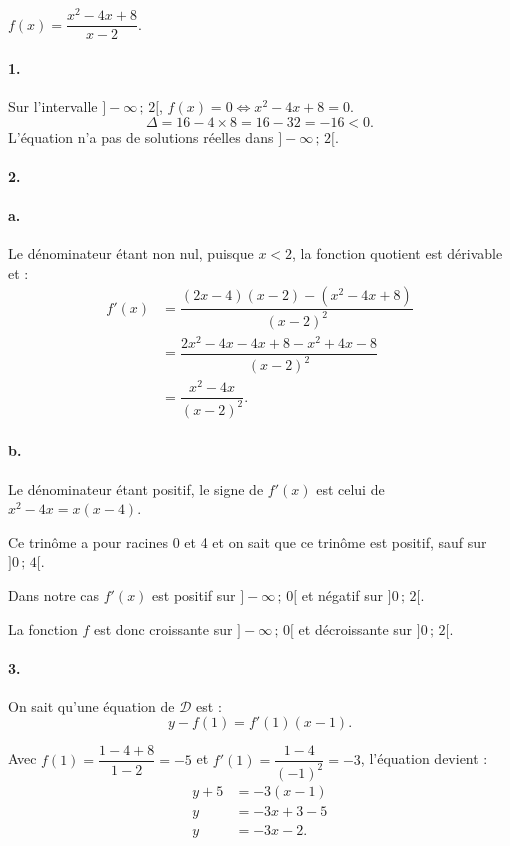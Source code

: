 \( f(x) = \dfrac{x^2 - 4x + 8}{x - 2} \).

\paragraph{1.} Sur l'intervalle \( ]-\infty \,;\, 2[ \), \( f(x) = 0 \iff x^2 - 4x + 8 = 0 \).
\[
\Delta = 16 - 4 \times 8 = 16 - 32 = -16 < 0.
\]
L'équation n'a pas de solutions réelles dans \( ]-\infty \,;\, 2[ \).

\paragraph{2.}

\paragraph{a.} Le dénominateur étant non nul, puisque \( x < 2 \), la fonction quotient est dérivable et :
\begin{align*}
f'(x) &= \dfrac{(2x - 4)(x - 2) - (x^2 - 4x + 8)}{(x - 2)^2} \\
&= \dfrac{2x^2 - 4x - 4x + 8 - x^2 + 4x - 8}{(x - 2)^2} \\
&= \dfrac{x^2 - 4x}{(x - 2)^2}.
\end{align*}

\paragraph{b.} Le dénominateur étant positif, le signe de \( f'(x) \) est celui de \( x^2 - 4x = x(x - 4) \).

Ce trinôme a pour racines 0 et 4 et on sait que ce trinôme est positif, sauf sur \( ]0 \,;\, 4[ \).

Dans notre cas \( f'(x) \) est positif sur \( ]-\infty \,;\, 0[ \) et négatif sur \( ]0 \,;\, 2[ \).

La fonction \( f \) est donc croissante sur \( ]-\infty \,;\, 0[ \) et décroissante sur \( ]0 \,;\, 2[ \).

\paragraph{3.} On sait qu'une équation de \( \mathcal{D} \) est :
\[
y - f(1) = f'(1)(x - 1).
\]

Avec \( f(1) = \dfrac{1 - 4 + 8}{1 - 2} = - 5 \) et \( f'(1) = \dfrac{1 - 4}{(-1)^2} = -3 \), l'équation devient :
\begin{align*}
y + 5 &= -3(x - 1) \\
y &= -3x + 3 - 5 \\
y &= -3x - 2.
\end{align*}

